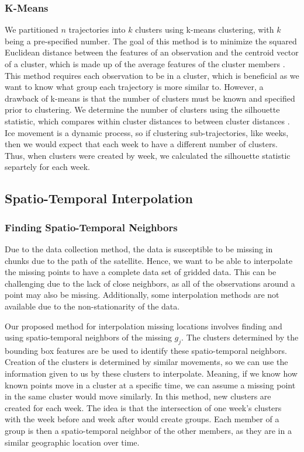 \documentclass[12pt]{article}
\begin{document}
\hypertarget{k-means}{%
\subsubsection{K-Means}\label{k-means}}

We partitioned \(n\) trajectories into \(k\) clusters using k-means
clustering, with \(k\) being a pre-specified number. The goal of this
method is to minimize the squared Euclidean distance between the
features of an observation and the centroid vector of a cluster, which
is made up of the average features of the cluster members
\citep{steinley_kmeans_2006}. This method requires each observation to
be in a cluster, which is beneficial as we want to know what group each
trajectory is more similar to. However, a drawback of k-means is that
the number of clusters must be known and specified prior to clustering.
We determine the number of clusters using the silhouette statistic,
which compares within cluster distances to between cluster distances
\citep{kodinariya_2013}. Ice movement is a dynamic process, so if
clustering sub-trajectories, like weeks, then we would expect that each
week to have a different number of clusters. Thus, when clusters were
created by week, we calculated the silhouette statistic separtely for
each week.

\hypertarget{spatio-temporal-interpolation}{%
\subsection{Spatio-Temporal
Interpolation}\label{spatio-temporal-interpolation}}

\hypertarget{finding-spatio-temporal-neighbors}{%
\subsubsection{Finding Spatio-Temporal
Neighbors}\label{finding-spatio-temporal-neighbors}}

Due to the data collection method, the data is susceptible to be missing
in chunks due to the path of the satellite. Hence, we want to be able to
interpolate the missing points to have a complete data set of gridded
data. This can be challenging due to the lack of close neighbors, as all
of the observations around a point may also be missing. Additionally,
some interpolation methods are not available due to the non-stationarity
of the data.

Our proposed method for interpolation missing locations involves finding
and using spatio-temporal neighbors of the missing \(g_j\). The clusters
determined by the bounding box features are be used to identify these
spatio-temporal neighbors. Creation of the clusters is determined by
similar movements, so we can use the information given to us by these
clusters to interpolate. Meaning, if we know how known points move in a
cluster at a specific time, we can assume a missing point in the same
cluster would move similarly. In this method, new clusters are created
for each week. The idea is that the intersection of one week's clusters
with the week before and week after would create groups. Each member of
a group is then a spatio-temporal neighbor of the other members, as they
are in a similar geographic location over time.
\end{document}

